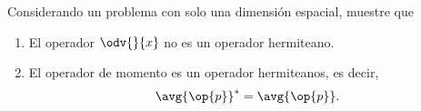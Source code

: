 \documentclass[../main.tex]{subfiles}
\begin{document}
\begin{problema}[10]
	Considerando un problema con solo una dimensión espacial, muestre que

	\begin{enumerate}
		\item El operador \(\odv{}{x}\) no es un operador hermiteano.
		\item El operador de momento es un operador hermiteanos, es decir,
		      \begin{equation*}
			      \avg{\op{p}}^{*} = \avg{\op{p}}.
		      \end{equation*}
	\end{enumerate}
\end{problema}
\end{document}
